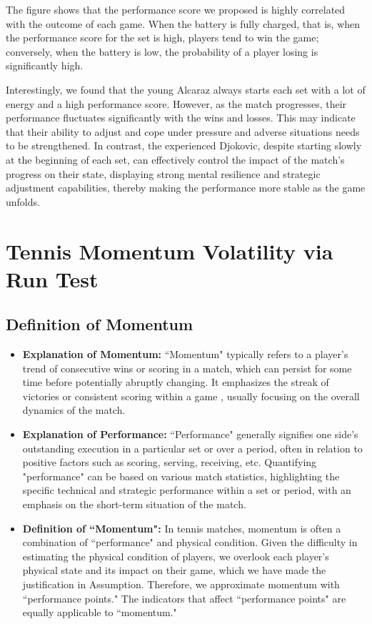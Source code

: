 \documentclass[12pt]{article}%
\begin{document}
The figure shows that the performance score we proposed is highly correlated with the outcome of each game. When the battery is fully charged, that is, when the performance score for the set is high, players tend to win the game; conversely, when the battery is low, the probability of a player losing is significantly high.

 Interestingly, we found that the young Alcaraz always starts each set with a lot of energy and a high performance score. However, as the match progresses, their performance fluctuates significantly with the wins and losses. This may indicate that their ability to adjust and cope under pressure and adverse situations needs to be strengthened. In contrast, the experienced Djokovic, despite starting slowly at the beginning of each set, can effectively control the impact of the match's progress on their state, displaying strong mental resilience and strategic adjustment capabilities, thereby making the performance more stable as the game unfolds.






\section{Tennis Momentum Volatility via Run Test}
\subsection{Definition of Momentum}
\begin{itemize}
	\setlength{\parsep}{0ex} %
	\setlength{\topsep}{2ex} %
	\setlength{\itemsep}{1ex} %
	\item \textbf{Explanation of Momentum:} ``Momentum" typically refers to a player's trend of consecutive wins or scoring in a match, which can persist for some time before potentially abruptly changing. It emphasizes the streak of victories or consistent scoring within a game \cite{gao2021random}, usually focusing on the overall dynamics of the match.
	
	\item \textbf{Explanation of Performance:} ``Performance" generally signifies one side’s outstanding execution in a particular set or over a period, often in relation to positive factors such as scoring, serving, receiving, etc. Quantifying "performance" can be based on various match statistics, highlighting the specific technical and strategic performance within a set or period, with an emphasis on the short-term situation of the match.
	
	\item \textbf{ Definition of ``Momentum":}  In tennis matches, momentum is often a combination of ``performance" and physical condition. Given the difficulty in estimating the physical condition of players, we overlook each player's physical state and its impact on their game, which we have made the justification in Assumption. Therefore, we approximate momentum with ``performance points." The indicators that affect ``performance points" are equally applicable to ``momentum."
\end{itemize}
\end{document}
